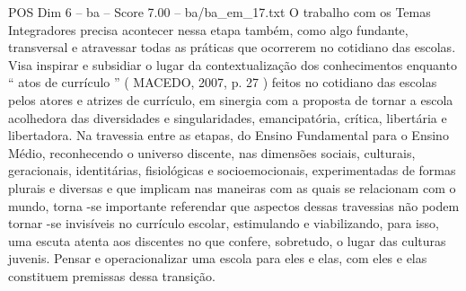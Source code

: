 \begin{textsample}{POS Dim 6 – ba – Score 7.00 – ba/ba\_em\_17.txt}
O trabalho com os Temas Integradores precisa acontecer nessa etapa também, como algo fundante, transversal e atravessar todas as práticas que ocorrerem no cotidiano das escolas.
Visa inspirar e subsidiar o lugar da contextualização dos conhecimentos enquanto “ atos de currículo ” ( MACEDO, 2007, p. 27 ) feitos no cotidiano das escolas pelos atores e atrizes de currículo, em sinergia com a proposta de tornar a escola acolhedora das diversidades e singularidades, emancipatória, crítica, libertária e libertadora.
Na travessia entre as etapas, do Ensino Fundamental para o Ensino Médio, reconhecendo o universo discente, nas dimensões sociais, culturais, geracionais, identitárias, fisiológicas e socioemocionais, experimentadas de formas plurais e diversas e que implicam nas maneiras com as quais se relacionam com o mundo, torna -se importante referendar que aspectos dessas travessias não podem tornar -se invisíveis no currículo escolar, estimulando e viabilizando, para isso, uma escuta atenta aos discentes no que confere, sobretudo, o lugar das culturas juvenis.
Pensar e operacionalizar uma escola para eles e elas, com eles e elas constituem premissas dessa transição.

\end{textsample}
